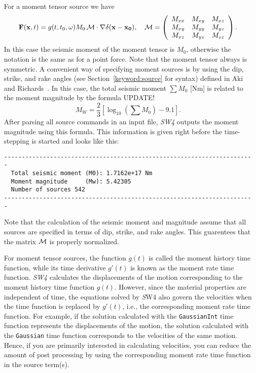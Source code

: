 \documentclass[11pt]{report}
\begin{document}
For a moment tensor source we have
\[
{\bf F}({\bf x},t) = g(t,t_0,\omega) M_0 \, {\cal  M} \cdot \nabla \delta ({\bf x} - {\bf
  x_0}), \quad 
{\cal M} = \left(\begin{array}{ccc}
M_{xx} & M_{xy} & M_{xz}\\
M_{xy} & M_{yy} & M_{yz}\\
M_{xz} & M_{yz} & M_{zz}
\end{array}
\right).
\]
In this case the seismic moment of the moment tensor is $M_0$, otherwise the notation is the same as
for a point force. Note that the moment tensor always is symmetric. A convenient way of specifying
moment sources is by using the dip, strike, and rake angles (see Section~\ref{keyword:source} for
syntax) defined in Aki and Richards~\cite{Aki-Richards-02}. In this case, the total seismic moment $\sum
M_0$ [Nm] is related to the moment magnitude by the formula UPDATE!
\[
M_W = \frac{2}{3}\left[\log_{10}\left(\sum M_0\right) - 9.1\right].
\]
After parsing all source commands in an input file, \emph{SW4} outputs the moment magnitude using
this formula. This information is given right before the time-stepping is started and looks like this:
\begin{verbatim}
-----------------------------------------------------------------------
  Total seismic moment (M0): 1.7162e+17 Nm 
  Moment magnitude     (Mw): 5.42305
  Number of sources 542
-----------------------------------------------------------------------
\end{verbatim}
Note that the calculation of the seismic moment and magnitude assume that all sources are specified
in terms of dip, strike, and rake angles. This guarentees that the matrix $\cal M$ is properly
normalized.

For moment tensor sources, the function $g(t)$ is called the moment history time function, while its
time derivative $g'(t)$ is known as the moment rate time function. \emph{SW4} calculates the
displacements of the motion corresponding to the moment history time function $g(t)$. However, since
the material properties are independent of time, the equations solved by {\emph SW4} also govern the
velocities when the time function is replaced by $g'(t)$, i.e., the corresponding moment rate time
function. For example, if the solution calculated with the {\tt GaussianInt} time function
represents the displacements of the motion, the solution calculated with the {\tt Gaussian} time
function corresponds to the velocities of the same motion. Hence, if you are primarily interested in
calculating velocities, you can reduce the amount of post processing by using the corresponding
moment rate time function in the source term(s). 
\end{document}
